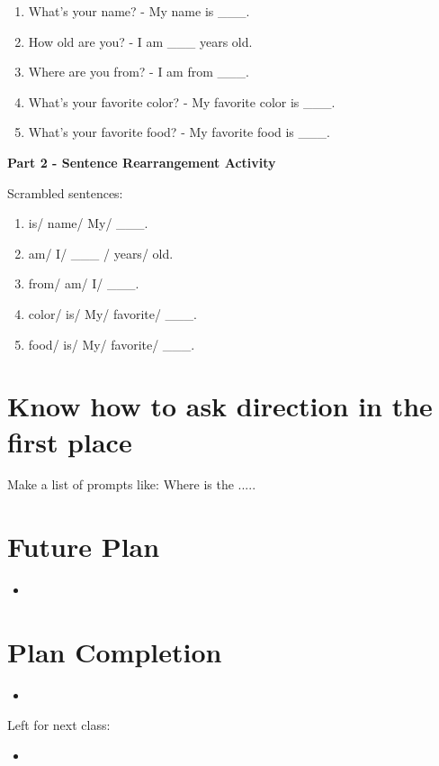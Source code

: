 \documentclass[12pt]{article}
\begin{document}
\begin{enumerate}[label=\arabic*]
    \item What's your name? - My name is \_\_\_. 
    \item How old are you? - I am \_\_\_ years old.
    \item Where are you from? - I am from \_\_\_.
    \item What's your favorite color? - My favorite color is \_\_\_.
    \item What's your favorite food? - My favorite food is \_\_\_.
\end{enumerate}

\noindent
\textbf{Part 2 - Sentence Rearrangement Activity}

\noindent
Scrambled sentences:

\begin{enumerate}[label=\arabic*]
    \item is/ name/ My/ \_\_\_.
    \item am/ I/ \_\_\_ / years/ old.
    \item from/ am/ I/ \_\_\_.
    \item color/ is/ My/ favorite/ \_\_\_.
    \item food/ is/ My/ favorite/ \_\_\_.
\end{enumerate}
\section*{Know how to ask direction in the first place}

Make a list of prompts like:
Where is the .....

\section{Future Plan}
\begin{itemize}
    \item 

\end{itemize}
\section{Plan Completion}
\begin{itemize}
    \item 
\end{itemize}
Left for next class: 
\begin{itemize}
    \item 
\end{itemize}
\end{document}
